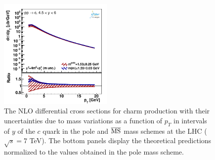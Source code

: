 \documentclass[12pt,a4paper]{article}
\newcommand{\msbar}{\ensuremath{\overline{\rm MS}}\xspace}
\begin{document}
\begin{figure}
    \includegraphics[width=0.49\textwidth]{figs/parton-ptmax20/dyn-therr-mass/data_401-4.pdf}
    \caption{The NLO differential cross sections for charm production with their uncertainties due to mass variations as a function of $p_T$ in intervals of $y$ of the $c$ quark in the pole and \msbar mass schemes at the LHC ($\sqrt{s} = 7$ TeV). The bottom panels display the theoretical predictions normalized to the values obtained in the pole mass scheme.}
    \label{fig:c-pty-mass}
\end{figure}
\end{document}
